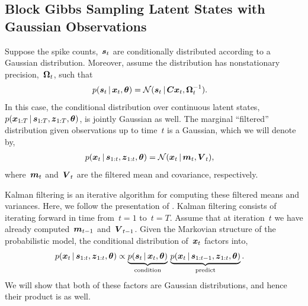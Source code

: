 \subsection{Block Gibbs Sampling Latent States with Gaussian Observations}
Suppose the spike counts,~$\boldsymbol{s}_t$ are conditionally distributed
according to a Gaussian distribution. Moreover, assume the
distribution has nonstationary precision,~$\boldsymbol{\Omega}_t$, such that
\begin{align}
  \label{eq:gauss_lkhd}
  p(\boldsymbol{s}_t \,|\, \boldsymbol{x}_t, \boldsymbol{\theta}) 
  &=
  \mathcal{N}(\boldsymbol{s}_t \,|\, \boldsymbol{C} \boldsymbol{x}_t, \boldsymbol{\Omega}_t^{-1}).
\end{align}
In this case, the conditional distribution over continuous latent
states,~${p(\boldsymbol{x}_{1:T} \,|\, \boldsymbol{s}_{1:T}, \boldsymbol{z}_{1:T}, \boldsymbol{\theta})}$, is
jointly Gaussian as well.  The marginal ``filtered'' distribution
given observations up to time~$t$ is a Gaussian, which we will denote
by,
\begin{align*}
  p(\boldsymbol{x}_t \,|\, \boldsymbol{s}_{1:t}, \boldsymbol{z}_{1:t}, \boldsymbol{\theta}) &= \mathcal{N}(\boldsymbol{x}_t \,|\, \boldsymbol{m}_t, \boldsymbol{V}_t),
\end{align*}
where~$\boldsymbol{m}_t$ and~$\boldsymbol{V}_t$ are the filtered mean and covariance, respectively.

Kalman filtering is an iterative algorithm for computing these filtered means 
and variances. 
Here, we follow the presentation of
\citet[Chapter 18]{murphy2012probabilistic}.  Kalman filtering consists
of iterating forward in time from~${t=1}$ to~${t=T}$. Assume that at iteration~$t$ we
have already computed~$\boldsymbol{m}_{t-1}$ and~$\boldsymbol{V}_{t-1}$. Given the
Markovian structure of the probabilistic model, the
conditional distribution of~$\boldsymbol{x}_t$ factors into,
\begin{align*}
  p(\boldsymbol{x}_t \,|\, \boldsymbol{s}_{1:t}, \boldsymbol{z}_{1:t}, \boldsymbol{\theta})
  &\propto
  \underbrace{p(\boldsymbol{s}_t \,|\, \boldsymbol{x}_t, \boldsymbol{\theta})}_{\text{condition}} \,
  \underbrace{p(\boldsymbol{x}_{t} \,|\, \boldsymbol{s}_{1:t-1}, \boldsymbol{z}_{1:t}, \boldsymbol{\theta})}_{\text{predict}}.
\end{align*}
We will show that both of these factors are Gaussian distributions, 
and hence their product is as well. 



